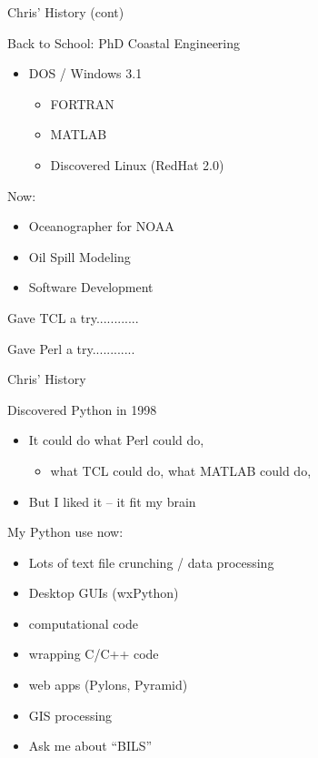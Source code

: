 \documentclass{beamer}
\begin{document}
      

\begin{frame}{Chris' History (cont) }

    {\Large Back to School: PhD Coastal Engineering }
    \begin{itemize}
      \item     DOS / Windows 3.1
      \begin{itemize}
        \item  FORTRAN
        \item  MATLAB
        \item   Discovered Linux (RedHat 2.0)
      \end{itemize}
    \end{itemize}

   \vspace{0.25in}
     
    {\Large Now: }
    \begin{itemize}
       \item Oceanographer for NOAA
       \item Oil Spill Modeling
       \item Software Development
    \end{itemize}

    \vspace{0.25in}
    {\Large Gave TCL a try............ }
    
    \vspace{0.15in}
    {\Large Gave Perl a try............}

\end{frame}

\begin{frame}{Chris' History}
    
{\Large Discovered Python in 1998}
\begin{itemize}
    \item It could do what Perl could do,
    \begin{itemize}
        \item what TCL could do, what MATLAB could do,
    \end{itemize}
    \item But I liked it -- it fit my brain
\end{itemize}

\vspace{0.1in}

{\Large     My Python use now:}
\begin{itemize}
   \item Lots of text file crunching / data processing
   \item Desktop GUIs (wxPython)
   \item computational code
   \item wrapping C/C++ code      
   \item web apps (Pylons, Pyramid)
   \item GIS processing
   \item Ask me about ``BILS'' 
\end{itemize}
\end{frame}
\end{document}
